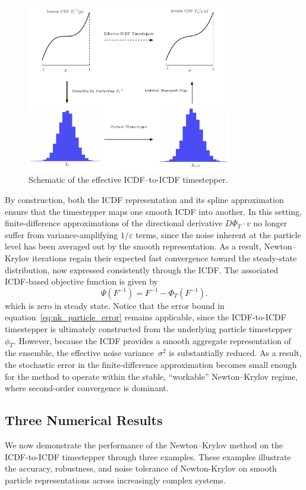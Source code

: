 \documentclass{article}
\begin{document}
\begin{figure}[!ht]
  \centering
  \includegraphics[width=0.8\textwidth]{ICDFtoICDF.pdf}
  \caption{Schematic of the effective ICDF–to-ICDF timestepper.}
  \label{fig:icdftoicdf}
\end{figure}

By construction, both the ICDF representation and its spline approximation ensure that the timestepper maps one smooth ICDF into another. In this setting, finite-difference approximations of the directional derivative $D\Phi_T \cdot v$ no longer suffer from variance-amplifying $1/\varepsilon$ terms, since the noise inherent at the particle level has been averaged out by the smooth representation. As a result, Newton–Krylov iterations regain their expected fast convergence toward the steady-state distribution, now expressed consistently through the ICDF. The associated ICDF-based objective function is given by
\begin{equation} \label{eq:icdf_residual}
\Psi(F^{-1}) = F^{-1}- \Phi_T(F^{-1}).
\end{equation}
which is zero in steady state. Notice that the error bound in equation~\eqref{eq:nk_particle_error} remains applicable, since the ICDF-to-ICDF timestepper is ultimately constructed from the underlying particle timestepper~$\phi_T$. However, because the ICDF provides a smooth aggregate representation of the ensemble, the effective noise variance~$\sigma^2$ is substantially reduced. As a result, the stochastic error in the finite-difference approximation becomes small enough for the method to operate within the stable, “workable” Newton–Krylov regime, where second-order convergence is dominant.

\subsection{Three Numerical Results}
We now demonstrate the performance of the Newton–Krylov method on the ICDF-to-ICDF timestepper through three examples. These examples illustrate the accuracy, robustness, and noise tolerance of Newton-Krylov on smooth particle representations across increasingly complex systems.
\end{document}

